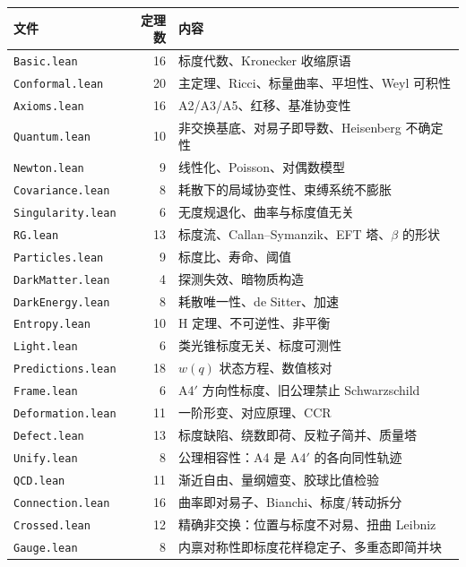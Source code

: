 \documentclass[11pt,a4paper]{article}
\theoremstyle{sudef}
\begin{document}
\begin{center}
\begin{longtable}{lrl}
\toprule
文件 & 定理数 & 内容 \\
\midrule
\texttt{Basic.lean}       & 16 & 标度代数、Kronecker 收缩原语 \\
\texttt{Conformal.lean}   & 20 & 主定理、Ricci、标量曲率、平坦性、Weyl 可积性 \\
\texttt{Axioms.lean}      & 16 & A2/A3/A5、红移、基准协变性 \\
\texttt{Quantum.lean}     & 10 & 非交换基底、对易子即导数、Heisenberg 不确定性 \\
\texttt{Newton.lean}      &  9 & 线性化、Poisson、对偶数模型 \\
\texttt{Covariance.lean}  &  8 & 耗散下的局域协变性、束缚系统不膨胀 \\
\texttt{Singularity.lean} &  6 & 无度规退化、曲率与标度值无关 \\
\texttt{RG.lean}          & 13 & 标度流、Callan–Symanzik、EFT 塔、$\beta$ 的形状 \\
\texttt{Particles.lean}   &  9 & 标度比、寿命、阈值 \\
\texttt{DarkMatter.lean}  &  4 & 探测失效、暗物质构造 \\
\texttt{DarkEnergy.lean}  &  8 & 耗散唯一性、de Sitter、加速 \\
\texttt{Entropy.lean}     & 10 & H 定理、不可逆性、非平衡 \\
\texttt{Light.lean}       &  6 & 类光锥标度无关、标度可测性 \\
\texttt{Predictions.lean} & 18 & $w(q)$ 状态方程、数值核对 \\
\texttt{Frame.lean}       &  6 & A4$'$ 方向性标度、旧公理禁止 Schwarzschild \\
\texttt{Deformation.lean} & 11 & 一阶形变、对应原理、CCR \\
\texttt{Defect.lean}      & 13 & 标度缺陷、绕数即荷、反粒子简并、质量塔 \\
\texttt{Unify.lean}       &  8 & 公理相容性：A4 是 A4$'$ 的各向同性轨迹 \\
\texttt{QCD.lean}         & 11 & 渐近自由、量纲嬗变、胶球比值检验 \\
\texttt{Connection.lean}  & 16 & 曲率即对易子、Bianchi、标度/转动拆分 \\
\texttt{Crossed.lean}     & 12 & 精确非交换：位置与标度不对易、扭曲 Leibniz \\
\texttt{Gauge.lean}       &  8 & 内禀对称性即标度花样稳定子、多重态即简并块 \\

\end{longtable}
\end{center}
\end{document}
